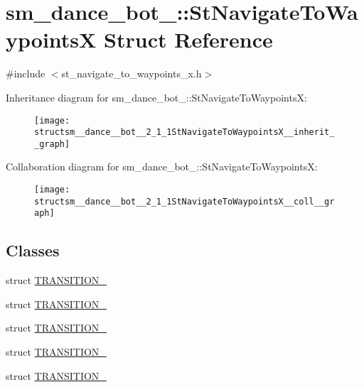 \hypertarget{structsm__dance__bot__2_1_1StNavigateToWaypointsX}{}\section{sm\+\_\+dance\+\_\+bot\+\_\+:\+:St\+Navigate\+To\+WaypointsX Struct Reference}
\label{structsm__dance__bot__2_1_1StNavigateToWaypointsX}


{\ttfamily \#include $<$st\+\_\+navigate\+\_\+to\+\_\+waypoints\+\_\+x.\+h$>$}



Inheritance diagram for sm\+\_\+dance\+\_\+bot\+\_\+:\+:St\+Navigate\+To\+WaypointsX\+:
\nopagebreak
\begin{figure}[H]
\begin{center}
\leavevmode
\texttt{[image: structsm\_\_dance\_\_bot\_\_2\_1\_1StNavigateToWaypointsX\_\_inherit\_\_graph]}
\end{center}
\end{figure}


Collaboration diagram for sm\+\_\+dance\+\_\+bot\+\_\+:\+:St\+Navigate\+To\+WaypointsX\+:
\nopagebreak
\begin{figure}[H]
\begin{center}
\leavevmode
\texttt{[image: structsm\_\_dance\_\_bot\_\_2\_1\_1StNavigateToWaypointsX\_\_coll\_\_graph]}
\end{center}
\end{figure}
\subsection*{Classes}
\begin{DoxyCompactItemize}
\item 
struct \hyperlink{structsm__dance__bot__2_1_1StNavigateToWaypointsX_1_1TRANSITION__1}{T\+R\+A\+N\+S\+I\+T\+I\+O\+N\+\_}
\item 
struct \hyperlink{structsm__dance__bot__2_1_1StNavigateToWaypointsX_1_1TRANSITION__2}{T\+R\+A\+N\+S\+I\+T\+I\+O\+N\+\_}
\item 
struct \hyperlink{structsm__dance__bot__2_1_1StNavigateToWaypointsX_1_1TRANSITION__3}{T\+R\+A\+N\+S\+I\+T\+I\+O\+N\+\_}
\item 
struct \hyperlink{structsm__dance__bot__2_1_1StNavigateToWaypointsX_1_1TRANSITION__4}{T\+R\+A\+N\+S\+I\+T\+I\+O\+N\+\_}
\item 
struct \hyperlink{structsm__dance__bot__2_1_1StNavigateToWaypointsX_1_1TRANSITION__5}{T\+R\+A\+N\+S\+I\+T\+I\+O\+N\+\_}
\end{DoxyCompactItemize}
